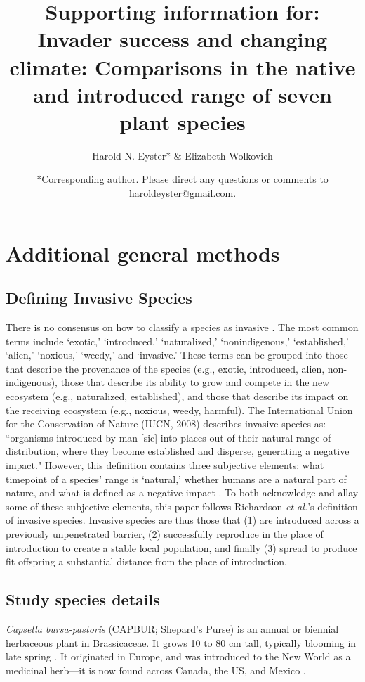 \documentclass[12pt]{article}\usepackage[]{graphicx}\usepackage[]{color}
\title{\textbf{Supporting information for:}  \\ \bigskip Invader success and changing climate: Comparisons in the native and introduced range of seven plant species}\author{Harold N. Eyster* \&  Elizabeth Wolkovich}
\date{*Corresponding author. Please direct any questions or comments to haroldeyster@gmail.com. }
\begin{document}
\maketitle
\tableofcontents
\section{Additional general methods}
\subsection{Defining Invasive Species}
There is no consensus on how to classify a species as invasive \parencite{Colautti2004}. The most common terms include `exotic,' `introduced,' `naturalized,' `nonindigenous,' `established,' `alien,' `noxious,' `weedy,' and `invasive.' These terms can be grouped into those that describe the provenance of the species (e.g., exotic, introduced, alien, non-indigenous), those that describe its ability to grow and compete in the new ecosystem (e.g., naturalized, established), and those that describe its impact on the receiving ecosystem (e.g., noxious, weedy, harmful). The International Union for the Conservation of Nature (IUCN, 2008) describes invasive species as: ``organisms introduced by man [sic] into places out of their natural range of distribution, where they become established and disperse, generating a negative impact." \nocite{IUCN2008is} However, this definition contains three subjective elements: what timepoint of a species' range is `natural,' whether humans are a natural part of nature, and what is defined as a negative impact \parencite{Munro2019}. To both acknowledge and allay some of these subjective elements, this paper follows Richardson \textit{et al.}'s \parencite{Richardson2000,Richardson2011} definition of invasive species. Invasive species are thus those that (1) are introduced across a previously unpenetrated barrier, (2) successfully reproduce in the place of introduction to create a stable local population, and finally (3) spread to produce fit offspring a substantial distance from the place of introduction.

\subsection{Study species details}
\textit{Capsella bursa-pastoris} (CAPBUR; Shepard's Purse) is an annual or biennial herbaceous plant in Brassicaceae. It grows 10 to 80 cm tall, typically blooming in late spring \parencite{Defelice2001}. It originated in Europe, and was introduced to the New World as a medicinal herb---it is now found across Canada, the US, and Mexico \parencite{Westrich1989}.
	
\end{document}
